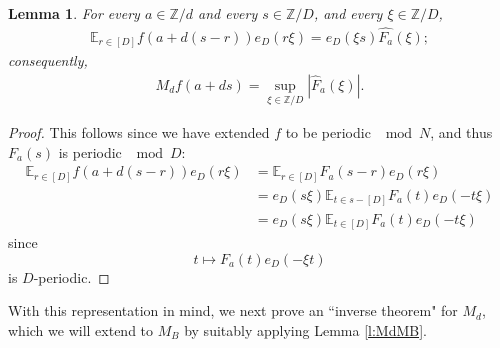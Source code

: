 \documentclass[12pt]{amsart}
\numberwithin{equation}{section}
\newtheorem{lemma}[theorem]{Lemma}
\theoremstyle{definition}
\begin{document}
\begin{lemma}
    For every $a \in \mathbb{Z}/d$ and every $s \in \mathbb{Z}/D$, and every $\xi \in \mathbb{Z}/D$,
    \begin{align}
        \mathbb{E}_{r \in [D]} f(a + d(s-r)) e_D(r \xi) = e_D(\xi s) \widehat{F_a}(\xi);
    \end{align}
consequently,
\begin{align}
    M_df(a+ds) = \sup_{\xi \in \mathbb{Z}/D} |\widehat{F}_a(\xi)|.
\end{align}
    \end{lemma}
\begin{proof}
This follows since we have extended $f$ to be periodic $\mod N$, and thus $F_a(s)$ is periodic $\mod D$:
\begin{align}
    \mathbb{E}_{r \in [D]} f(a + d(s-r)) e_D(r \xi) &= \mathbb{E}_{r \in [D]} F_a(s-r) e_D(r\xi) \\
    & = e_D(s \xi) \mathbb{E}_{t \in s- [D]} F_a(t) e_D(-t \xi) \\
    & = e_D(s \xi) \mathbb{E}_{t \in [D]} F_a(t) e_D(-t \xi)
\end{align}
since 
\[ t \mapsto F_a(t) e_D(-\xi t) \]
is $D$-periodic.
\end{proof}

With this representation in mind, we next prove an ``inverse theorem" for $M_d$, which we will extend to $M_B$ by suitably applying Lemma \ref{l:MdMB}.
\end{document}
